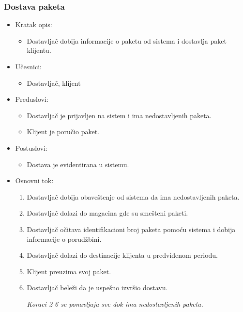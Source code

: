 
\subsubsection{Dostava paketa}

	\begin{itemize}
		\item{Kratak opis:} 
		\begin{itemize}
			\item{Dostavljač dobija informacije o paketu od sistema i dostavlja paket klijentu.}
		\end{itemize}
		
		\item{Učesnici:} 
		\begin{itemize}
			\item{Dostavljač, klijent}
		\end{itemize}		
		
		\item{Preduslovi:}
		\begin{itemize}
			\item{Dostavljač je prijavljen na sistem i ima nedostavljenih paketa. }
			\item{Klijent je poručio paket.}
		\end{itemize}		

		\item{Postuslovi:}
		\begin{itemize}
			\item{Dostava je evidentirana u sistemu.}
		\end{itemize}		
		
		\item{Osnovni tok:}
		\begin{enumerate}
			\item{Dostavljač dobija obaveštenje od sistema da ima nedostavljenih paketa.}
			\item{Dostavljač dolazi do magacina gde su smešteni paketi.}
			\item{Dostavljač očitava identifikacioni broj paketa pomoću sistema i dobija informacije o porudžbini.}
			\item{Dostavljač dolazi do destinacije klijenta u predviđenom periodu.}
			\item{Klijent preuzima svoj paket.}
			\item{Dostavljač beleži da je uspešno izvršio dostavu.}
			
			
			\textit{Koraci 2-6 se ponavljaju sve dok ima nedostavljenih paketa.}
		\end{enumerate}
		

\end{itemize}
